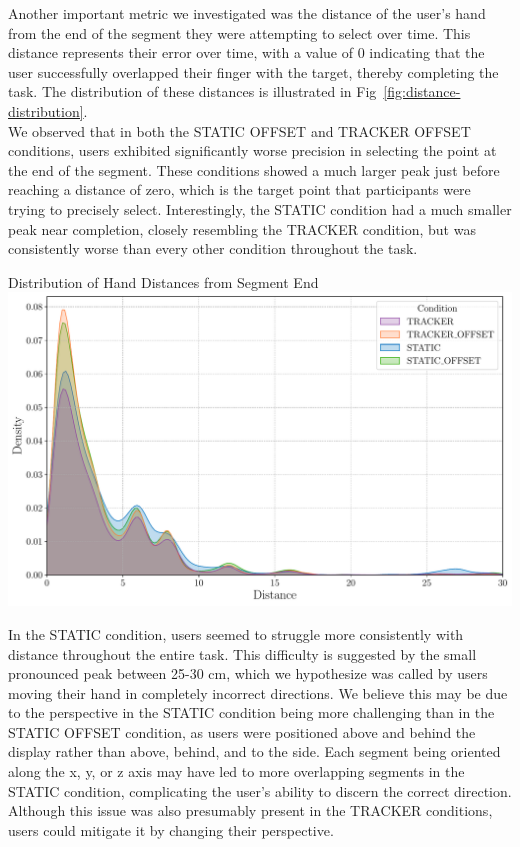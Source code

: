 Another important metric we investigated was the distance of the user's hand from the end of the segment they were attempting to select over time. This distance represents their error over time, with a value of 0 indicating that the user successfully overlapped their finger with the target, thereby completing the task. The distribution of these distances is illustrated in Fig~\ref{fig:distance-distribution}. \\

We observed that in both the STATIC OFFSET and TRACKER OFFSET conditions, users exhibited significantly worse precision in selecting the point at the end of the segment. These conditions showed a much larger peak just before reaching a distance of zero, which is the target point that participants were trying to precisely select. Interestingly, the STATIC condition had a much smaller peak near completion, closely resembling the TRACKER condition, but was consistently worse than every other condition throughout the task. \\

\begin{figureBox}[label={fig:distance-distribution}, width=1.0\linewidth]{Distribution of Hand Distances from Segment End}
    \includegraphics[width = 1.0\linewidth]{./evaluation/figures/survery/distance-distribution.pdf}
\end{figureBox}

In the STATIC condition, users seemed to struggle more consistently with distance throughout the entire task. This difficulty is suggested by the small pronounced peak between 25-30 cm, which we hypothesize was called by users moving their hand in completely incorrect directions. We believe this may be due to the perspective in the STATIC condition being more challenging than in the STATIC OFFSET condition, as users were positioned above and behind the display rather than above, behind, and to the side. Each segment being oriented along the x, y, or z axis may have led to more overlapping segments in the STATIC condition, complicating the user's ability to discern the correct direction. Although this issue was also presumably present in the TRACKER conditions, users could mitigate it by changing their perspective. \\

